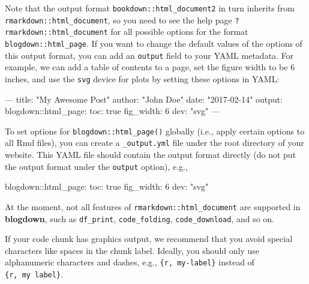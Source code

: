 \documentclass[12pt,]{krantz}
\makeatletter
\newenvironment{Shaded}{\begin{snugshade}}{\end{snugshade}}
\newcommand{\AttributeTok}[1]{\textcolor[rgb]{0.77,0.63,0.00}{#1}}
\newcommand{\FunctionTok}[1]{\textcolor[rgb]{0.00,0.00,0.00}{#1}}
\newcommand{\OtherTok}[1]{\textcolor[rgb]{0.56,0.35,0.01}{#1}}
\newcommand{\StringTok}[1]{\textcolor[rgb]{0.31,0.60,0.02}{#1}}
\newenvironment{kframe}{%
\medskip{}
\setlength{\fboxsep}{.8em}
 \def\at@end@of@kframe{}%
 \ifinner\ifhmode%
  \def\at@end@of@kframe{\end{minipage}}%
  \begin{minipage}{\columnwidth}%
 \fi\fi%
 \def\FrameCommand##1{\hskip\@totalleftmargin \hskip-\fboxsep
 \colorbox{shadecolor}{##1}\hskip-\fboxsep
     \hskip-\linewidth \hskip-\@totalleftmargin \hskip\columnwidth}%
 \MakeFramed {\advance\hsize-\width
   \@totalleftmargin\z@ \linewidth\hsize
   \@setminipage}}%
 {\par\unskip\endMakeFramed%
 \at@end@of@kframe}
\renewenvironment{Shaded}{\begin{kframe}}{\end{kframe}}
\theoremstyle{definition}
\theoremstyle{definition}
\theoremstyle{definition}
\theoremstyle{remark}
\makeatother
\begin{document}
Note that the output format \texttt{bookdown::html\_document2} in turn
inherits from \texttt{rmarkdown::html\_document}, so you need to see the
help page \texttt{?rmarkdown::html\_document} for all possible options
for the format \texttt{blogdown::html\_page}. If you want to change the
default values of the options of this output format, you can add an
\texttt{output} field to your YAML metadata. For example, we can add a
table of contents to a page, set the figure width to be 6 inches, and
use the \texttt{svg} device for plots by setting these options in YAML:

\begin{Shaded}
\begin{Highlighting}[]
\OtherTok{---}
\FunctionTok{title:}\AttributeTok{ }\StringTok{"My Awesome Post"}
\FunctionTok{author:}\AttributeTok{ }\StringTok{"John Doe"}
\FunctionTok{date:}\AttributeTok{ }\StringTok{"2017-02-14"}
\FunctionTok{output:}
  \FunctionTok{blogdown:}\AttributeTok{:html_page:}
    \FunctionTok{toc:}\AttributeTok{ true}
    \FunctionTok{fig_width:}\AttributeTok{ 6}
    \FunctionTok{dev:}\AttributeTok{ }\StringTok{"svg"}
\OtherTok{---}
\end{Highlighting}
\end{Shaded}

To set options for \texttt{blogdown::html\_page()} globally (i.e., apply
certain options to all Rmd files), you can create a
\texttt{\_output.yml} file under the root directory of your website.
This YAML file should contain the output format directly (do not put the
output format under the \texttt{output} option), e.g.,

\begin{Shaded}
\begin{Highlighting}[]
\FunctionTok{blogdown:}\AttributeTok{:html_page:}
  \FunctionTok{toc:}\AttributeTok{ true}
  \FunctionTok{fig_width:}\AttributeTok{ 6}
  \FunctionTok{dev:}\AttributeTok{ }\StringTok{"svg"}
\end{Highlighting}
\end{Shaded}

At the moment, not all features of \texttt{rmarkdown::html\_document}
are supported in \textbf{blogdown}, such as \texttt{df\_print},
\texttt{code\_folding}, \texttt{code\_download}, and so on.

If your code chunk has graphics output, we recommend that you avoid
special characters like spaces in the chunk label. Ideally, you should
only use alphanumeric characters and dashes, e.g.,
\texttt{\textasciigrave{}\textasciigrave{}\textasciigrave{}\{r,\ my-label\}}
instead of
\texttt{\textasciigrave{}\textasciigrave{}\textasciigrave{}\{r,\ my\ label\}}.
\end{document}
